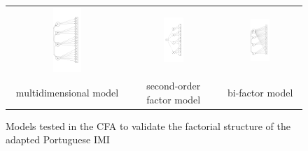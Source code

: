 \begin{figure}[htb!]
 \caption{Models tested in the CFA to validate the factorial structure of the adapted Portuguese IMI}
 \label{fig:imi-models-cfa}
 \centering
 \begin{tabular}{ccc}
 \includegraphics[width=0.25\textwidth]{images/appendix/imi-multidimensional-model.png} &
 \includegraphics[width=0.25\textwidth]{images/appendix/imi-second-order-factor-model} &
 \includegraphics[width=0.25\textwidth]{images/appendix/imi-bi-factor-model.png} \\
 {\scriptsize multidimensional model} & {\scriptsize second-order factor model} & {\scriptsize bi-factor model} \\
 \end{tabular}
 \fautor
\end{figure}

